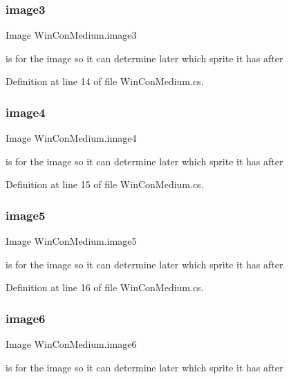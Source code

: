\subsubsection{\texorpdfstring{image3}{image3}}
{\footnotesize\ttfamily Image Win\+Con\+Medium.\+image3}

is for the image so it can determine later which sprite it has after 

Definition at line 14 of file Win\+Con\+Medium.\+cs.

\mbox{\label{class_win_con_medium_a476c34b9107feaa34b183b8c34aaca62}} 
\subsubsection{\texorpdfstring{image4}{image4}}
{\footnotesize\ttfamily Image Win\+Con\+Medium.\+image4}

is for the image so it can determine later which sprite it has after 

Definition at line 15 of file Win\+Con\+Medium.\+cs.

\mbox{\label{class_win_con_medium_a729bd8f69a5b1c8e587e69a15cf8e326}} 
\subsubsection{\texorpdfstring{image5}{image5}}
{\footnotesize\ttfamily Image Win\+Con\+Medium.\+image5}

is for the image so it can determine later which sprite it has after 

Definition at line 16 of file Win\+Con\+Medium.\+cs.

\mbox{\label{class_win_con_medium_af97e5d457da2829765f1c437075c25c0}} 
\subsubsection{\texorpdfstring{image6}{image6}}
{\footnotesize\ttfamily Image Win\+Con\+Medium.\+image6}

is for the image so it can determine later which sprite it has after 

